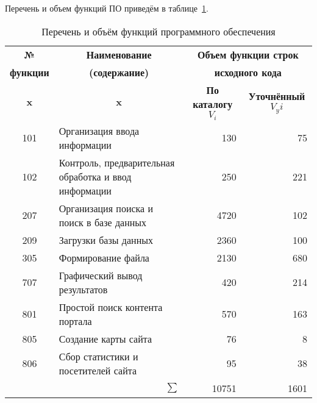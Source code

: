 Перечень и объем функций ПО приведём в таблице~\ref{tab:vPO}.

\begin{table}[h!]
    \centering

    \caption{Перечень и объём функций программного обеспечения}
    \label{tab:vPO}

    \begin{tabular}{|p{2cm}|p{6cm}|p{3cm}|p{3cm}|} 
        \hline
        \multicolumn{1}{|c|}{\textbf{№}}
        & \multicolumn{1}{c|}{\textbf{Наименование}}
        & \multicolumn{2}{c|}{\textbf{Объем функции строк}} \\

        \multicolumn{1}{|c|}{\textbf{функции}}
        & \multicolumn{1}{c|}{\textbf{(содержание)}}
        & \multicolumn{2}{c|}{\textbf{исходного кода}} \\ \hline

        \multicolumn{1}{|c|}{\textbf{x}}
        & \multicolumn{1}{c|}{\textbf{x}}
        & \multicolumn{1}{c|}{\textbf{По каталогу $V_i$}}
        & \multicolumn{1}{c|}{\textbf{Уточнённый $V_yi$}} \\ \hline

        \multicolumn{1}{|c|}{101} & Организация ввода информации                            & \multicolumn{1}{r|}{130 } & \multicolumn{1}{r|}{75  } \\ \hline
        \multicolumn{1}{|c|}{102} & Контроль, предварительная обработка и ввод информации   & \multicolumn{1}{r|}{250 } & \multicolumn{1}{r|}{221 } \\ \hline
        \multicolumn{1}{|c|}{207} & Организация поиска и поиск в базе данных                & \multicolumn{1}{r|}{4720} & \multicolumn{1}{r|}{102 } \\ \hline
        \multicolumn{1}{|c|}{209} & Загрузки базы данных                                    & \multicolumn{1}{r|}{2360} & \multicolumn{1}{r|}{100 } \\ \hline
        \multicolumn{1}{|c|}{305} & Формирование файла                                      & \multicolumn{1}{r|}{2130} & \multicolumn{1}{r|}{680 } \\ \hline
        \multicolumn{1}{|c|}{707} & Графический вывод результатов                           & \multicolumn{1}{r|}{420 } & \multicolumn{1}{r|}{214 } \\ \hline
        \multicolumn{1}{|c|}{801} & Простой поиск контента портала                          & \multicolumn{1}{r|}{570 } & \multicolumn{1}{r|}{163 } \\ \hline
        \multicolumn{1}{|c|}{805} & Создание карты сайта                                    & \multicolumn{1}{r|}{76  } & \multicolumn{1}{r|}{8   } \\ \hline
        \multicolumn{1}{|c|}{806} & Сбор статистики и посетителей сайта                     & \multicolumn{1}{r|}{95  } & \multicolumn{1}{r|}{38  } \\ \hline

        \multicolumn{2}{|r|}{$\sum$}                                                        & \multicolumn{1}{r|}{10751} & \multicolumn{1}{r|}{1601} \\ \hline
    \end{tabular}
\end{table}

